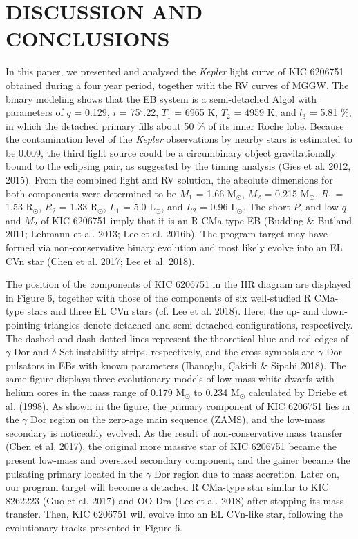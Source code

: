 \documentclass[useAMS,usenatbib,usegraphicx]{mn2e}
\begin{document}
\section{DISCUSSION AND CONCLUSIONS}

In this paper, we presented and analysed the {\it Kepler} light curve of KIC 6206751 obtained during a four year period, 
together with the RV curves of MGGW. The binary modeling shows that the EB system is a semi-detached Algol with parameters 
of $q$ = 0.129, $i$ = 75$^\circ$.22, $T_1$ = 6965 K, $T_2$ = 4959 K, and $l_{3}$ = 5.81 \%, in which the detached primary 
fills about 50 \% of its inner Roche lobe. Because the contamination level of the {\it Kepler} observations by nearby stars 
is estimated to be 0.009, the third light source could be a circumbinary object gravitationally bound to the eclipsing pair, 
as suggested by the timing analysis (Gies et al. 2012, 2015). From the combined light and RV solution, 
the absolute dimensions for both components were determined to be $M_1$ = 1.66 M$_\odot$, $M_2$ = 0.215 M$_\odot$, 
$R_1$ = 1.53 R$_\odot$, $R_2$ = 1.33 R$_\odot$, $L_1$ = 5.0 L$_\odot$, and $L_2$ = 0.96 L$_\odot$. The short $P$, and 
low $q$ and $M_2$ of KIC 6206751 imply that it is an R CMa-type EB (Budding \& Butland 2011; Lehmann et al. 2013; 
Lee et al. 2016b). The program target may have formed via non-conservative binary evolution and most likely evolve into 
an EL CVn star (Chen et al. 2017; Lee et al. 2018).

The position of the components of KIC 6206751 in the HR diagram are displayed in Figure 6, together with those of 
the components of six well-studied R CMa-type stars and three EL CVn stars (cf. Lee et al. 2018). Here, the up- and 
down-pointing triangles denote detached and semi-detached configurations, respectively. The dashed and dash-dotted lines 
represent the theoretical blue and red edges of $\gamma$ Dor and $\delta$ Sct instability strips, respectively, and 
the cross symbols are $\gamma$ Dor pulsators in EBs with known parameters 
(Ibanoglu, \c Cakirli \& Sipahi 2018). The same figure displays three evolutionary models of low-mass white dwarfs with 
helium cores in the mass range of 0.179 M$_\odot$ to 0.234 M$_\odot$ calculated by Driebe et al. (1998). As shown in 
the figure, the primary component of KIC 6206751 lies in the $\gamma$ Dor region on the zero-age main sequence (ZAMS), and 
the low-mass secondary is noticeably evolved. As the result of non-conservative mass transfer (Chen et al. 2017), 
the original more massive star of KIC 6206751 became the present low-mass and oversized secondary component, and the gainer 
became the pulsating primary located in the $\gamma$ Dor region due to mass accretion. Later on, our program target will 
become a detached R CMa-type star similar to KIC 8262223 (Guo et al. 2017) and OO Dra (Lee et al. 2018) after stopping 
its mass transfer. Then, KIC 6206751 will evolve into an EL CVn-like star, following the evolutionary tracks presented in 
Figure 6. 
\end{document}
